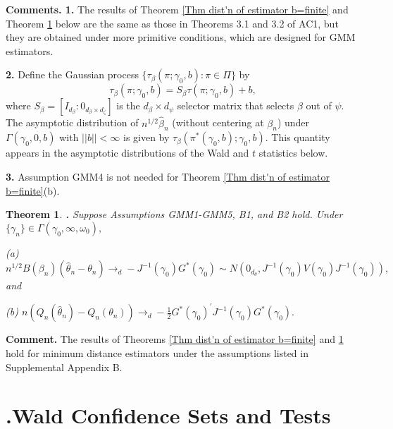 \documentclass[12pt,titlepage,final,oneside,letterpaper]{article}
\newtheorem{theorem}{Theorem}[section]
\begin{document}
\noindent \textbf{Comments. 1. }The results of Theorem \ref{Thm dist'n of
estimator b=finite} and Theorem \ref{Thm dist'n of estimator b=inf} below
are the same as those in Theorems 3.1 and 3.2 of AC1, but they are obtained
under more primitive conditions, which are designed for GMM estimators.

\textbf{2. }Define the Gaussian process $\{\tau _{\beta }(\pi ;\gamma
_{0},b):\pi \in \Pi \}$ by 
\begin{equation}
\tau _{\beta }(\pi ;\gamma _{0},b)=S_{\beta }\tau (\pi ;\gamma _{0},b)+b,
\label{Asy Distn of Betahat(pi)}
\end{equation}%
where $S_{\beta }=[I_{d_{\beta }}:0_{d_{\beta }\times d_{\zeta }}]$ is the $%
d_{\beta }\times d_{\psi }$ selector matrix that selects $\beta $ out of $%
\psi .$ The asymptotic distribution of $n^{1/2}\widehat{\beta }_{n}$
(without centering at $\beta _{n}$) under $\Gamma (\gamma _{0},0,b)$ with $%
||b||<\infty $ is given by $\tau _{\beta }(\pi ^{\ast }(\gamma
_{0},b);\gamma _{0},b).$ This quantity appears in the asymptotic
distributions of the Wald and $t$ statistics below.

\textbf{3. }Assumption GMM4 is not needed for Theorem \ref{Thm dist'n of
estimator b=finite}(b).

\begin{theorem}
\hspace{-0.08in}\textbf{. }\label{Thm dist'n of estimator b=inf}Suppose
Assumptions \emph{GMM1-GMM5, B1, }and \emph{B2} hold. Under $\{\gamma
_{n}\}\in \Gamma (\gamma _{0},\infty ,\omega _{0}),$

\noindent \emph{(a)} $n^{1/2}B(\beta _{n})(\widehat{\theta }_{n}-\theta
_{n})\rightarrow _{d}-J^{-1}(\gamma _{0})G^{\ast }(\gamma _{0})\sim
N(0_{d_{\theta }},J^{-1}(\gamma _{0})V(\gamma _{0})J^{-1}(\gamma _{0})),$ and

\noindent \emph{(b)} $n(Q_{n}(\widehat{\theta }_{n})-Q_{n}(\theta
_{n}))\rightarrow _{d}-\frac{1}{2}G^{\ast }(\gamma _{0})^{\prime
}J^{-1}(\gamma _{0})G^{\ast }(\gamma _{0}).$
\end{theorem}

\noindent \textbf{Comment. }The results of Theorems \ref{Thm dist'n of
estimator b=finite} and \ref{Thm dist'n of estimator b=inf} hold for minimum
distance estimators under the assumptions listed in Supplemental Appendix B.

\section{ \hspace{-0.34in}\textbf{.}\hspace{0.2in}Wald Confidence Sets and
Tests\label{Wald Tests Sec}}
\end{document}

